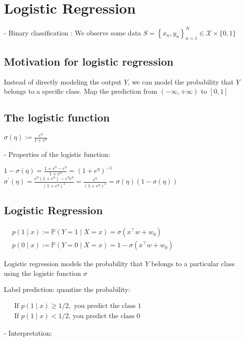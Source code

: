
\section*{Logistic Regression}
- Binary classification : We observe some data $S=\left\{x_{n}, y_{n}\right\}_{n=1}^{N} \in \mathscr{X} \times\{0,1\}$


\subsection*{Motivation for logistic regression}
Instead of directly modeling the output $Y$, we can model the probability that $Y$ belongs to a specific class. Map the prediction from $(-\infty,+\infty)$ to $[0,1]$

\subsection*{The logistic function}
$
\sigma(\eta):=\frac{e^{\eta}}{1+e^{\eta}}
$

- Properties of the logistic function:


$1-\sigma(\eta)=\frac{1+e^{\eta}-e^{\eta}}{1+e^{\eta}}=\left(1+e^{\eta}\right)^{-1}$
$\sigma^{\prime}(\eta)=\frac{e^{\eta}\left(1+e^{\eta}\right)-e^{\eta} e^{\eta}}{\left(1+e^{\eta}\right)^{2}}=\frac{e^{\eta}}{\left(1+e^{\eta}\right)^{2}}=\sigma(\eta)(1-\sigma(\eta))$

\subsection*{Logistic Regression}
$
\begin{aligned}
& p(1 \mid x):=\mathbb{P}(Y=1 \mid X=x)=\sigma\left(x^{\top} w+w_{0}\right) \\
& p(0 \mid x):=\mathbb{P}(Y=0 \mid X=x)=1-\sigma\left(x^{\top} w+w_{0}\right)
\end{aligned}
$

Logistic regression models the probability that $Y$ belongs to a particular class using the logistic function $\sigma$

Label prediction: quantize the probability:

$
\begin{aligned}
& \text { If } p(1 \mid x) \geq 1 / 2, \text { you predict the class } 1 \\
& \text { If } p(1 \mid x)<1 / 2 \text {, you predict the class } 0
\end{aligned}
$

- Interpretation:

